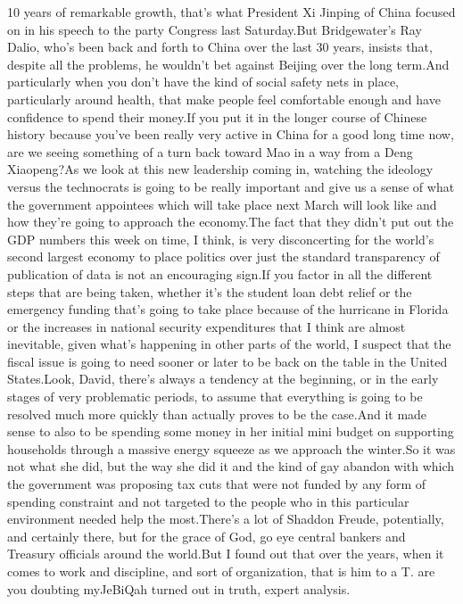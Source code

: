 \documentclass{article}%
\begin{document}
10 years of remarkable growth, that's what President Xi Jinping of China focused on in his speech to the party Congress last Saturday.But Bridgewater's Ray Dalio, who's been back and forth to China over the last 30 years, insists that, despite all the problems, he wouldn't bet against Beijing over the long term.And particularly when you don't have the kind of social safety nets in place, particularly around health, that make people feel comfortable enough and have confidence to spend their money.If you put it in the longer course of Chinese history because you've been really very active in China for a good long time now, are we seeing something of a turn back toward Mao in a way from a Deng Xiaopeng?As we look at this new leadership coming in, watching the ideology versus the technocrats is going to be really important and give us a sense of what the government appointees which will take place next March will look like and how they're going to approach the economy.The fact that they didn't put out the GDP numbers this week on time, I think, is very disconcerting for the world's second largest economy to place politics over just the standard transparency of publication of data is not an encouraging sign.If you factor in all the different steps that are being taken, whether it's the student loan debt relief or the emergency funding that's going to take place because of the hurricane in Florida or the increases in national security expenditures that I think are almost inevitable, given what's happening in other parts of the world, I suspect that the fiscal issue is going to need sooner or later to be back on the table in the United States.Look, David, there's always a tendency at the beginning, or in the early stages of very problematic periods, to assume that everything is going to be resolved much more quickly than actually proves to be the case.And it made sense to also to be spending some money in her initial mini budget on supporting households through a massive energy squeeze as we approach the winter.So it was not what she did, but the way she did it and the kind of gay abandon with which the government was proposing tax cuts that were not funded by any form of spending constraint and not targeted to the people who in this particular environment needed help the most.There's a lot of Shaddon Freude, potentially, and certainly there, but for the grace of God, go eye central bankers and Treasury officials around the world.But I found out that over the years, when it comes to work and discipline, and sort of organization, that is him to a T. are you doubting myJeBiQah turned out in truth, expert analysis.%
\end{document}
